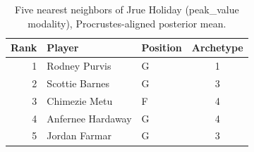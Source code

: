 \begin{table}[htbp]
  \centering\small
  \begin{tabular}{rllc}
    \toprule
    Rank & Player & Position & Archetype \\
    \midrule
    1 & Rodney Purvis & G & 1 \\
    2 & Scottie Barnes & G & 3 \\
    3 & Chimezie Metu & F & 4 \\
    4 & Anfernee Hardaway & G & 4 \\
    5 & Jordan Farmar & G & 3 \\
    \bottomrule
  \end{tabular}
  \caption{Five nearest neighbors of Jrue Holiday (peak_value modality), Procrustes-aligned posterior mean.}
  \label{tab:Jrue_Holiday_neighbors_peak_value}
\end{table}

